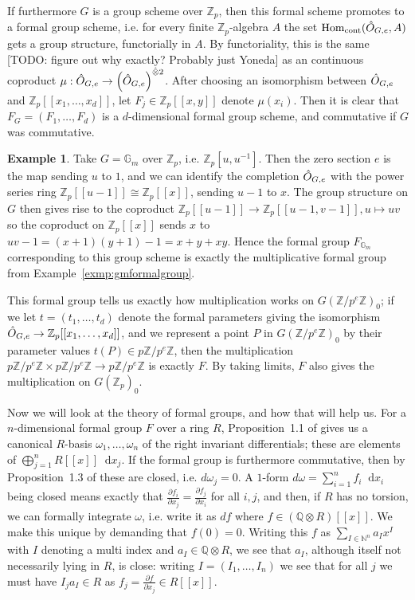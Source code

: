 \documentclass[12pt]{article}
\newcommand{\N}{\mathbb{N}}
\newcommand{\Z}{\mathbb{Z}}
\renewcommand{\G}{\mathbb{G}}
\newcommand{\Q}{\mathbb{Q}}
\newcommand*\diff{\mathop{}\!\mathrm{d}}
\newcommand{\tensor}{\otimes}
\DeclareMathOperator{\Hom}{Hom}
\theoremstyle{plain}
\theoremstyle{definition}
\newtheorem{exmp}[thm]{Example} %
\theoremstyle{remark}
\begin{document}
If furthermore $G$ is a group scheme over $\Z_p$, then this formal scheme promotes to a formal group scheme, i.e. for every finite $\Z_p$-algebra $A$ the set $\Hom_{\text{cont}}(\Hat{O}_{G,e},A)$ gets a group structure, functorially in $A$. By functoriality, this is the same [TODO: figure out why exactly? Probably just Yoneda] as an continuous coproduct $\mu: \Hat{O}_{G,e} \to \left(\Hat{O}_{G,e}\right)^{\Hat{\tensor} 2}$. After choosing an isomorphism between $\Hat{O}_{G,e}$ and $\Z_p[[x_1,\dots,x_d]]$, let $F_j \in \Z_p[[x,y]]$ denote $\mu(x_i)$. Then it is clear that $F_G = (F_1,\dots,F_d)$ is a $d$-dimensional formal group scheme, and commutative if $G$ was commutative.
\begin{exmp}
\label{exmp:gmtoformal} 
Take $G = \G_m$ over $\Z_p$, i.e. $\Z_p[u,u^{-1}]$. Then the zero section $e$ is the map sending $u$ to $1$, and we can identify the completion $\Hat{O}_{G,e}$ with the power series ring $\Z_p[[u-1]] \cong \Z_p[[x]]$, sending $u-1$ to $x$. The group structure on $G$ then gives rise to the coproduct $\Z_p[[u-1]] \to \Z_p[[u-1,v-1]], u \mapsto uv$ so the coproduct on $\Z_p[[x]]$ sends $x$ to $uv-1 = (x+1)(y+1) -1 = x + y + xy$. Hence the formal group $F_{\G_m}$ corresponding to this group scheme is exactly the multiplicative formal group from Example~\ref{exmp:gmformalgroup}.
\end{exmp}

This formal group tells us exactly how multiplication works on $G(\Z/p^e\Z)_0$; if we let $t = (t_1,\dots,t_d)$ denote the formal parameters giving the isomorphism $\Hat{O}_{G,e} \to \Z_p[[x_1,\dots,x_d]]$, and we represent a point $P$ in $G(\Z/p^e\Z)_0$ by their parameter values $t(P) \in p\Z/p^e\Z$, then the multiplication $p\Z/p^e\Z \times p\Z/p^e\Z \to p\Z/p^e\Z$ is exactly $F$. By taking limits, $F$ also gives the multiplication on $G(\Z_p)_0$.

Now we will look at the theory of formal groups, and how that will help us. For a $n$-dimensional formal group $F$ over a ring $R$, Proposition~1.1 of \citep{honda70} gives us a canonical $R$-basis $\omega_1,\dots,\omega_n$ of the right invariant differentials; these are elements of $\bigoplus_{j=1}^n R[[x]] \diff x_j$. If the formal group is furthermore commutative, then by Proposition~1.3 of \citep{honda70} these are closed, i.e. $d\omega_j = 0$. A $1$-form $d\omega = \sum_{i=1}^n f_i \diff x_i$ being closed means exactly that $\frac{\partial f_i}{\partial x_j} = \frac{\partial f_j}{\partial x_i}$ for all $i,j$, and then, if $R$ has no torsion, we can formally integrate $\omega$, i.e. write it as $df$ where $f \in (\Q\tensor R)[[x]]$. We make this unique by demanding that $f(0) = 0$. Writing this $f$ as $\sum_{I \in \N^n} a_I x^I$ with $I$ denoting a multi index and $a_I \in \Q\tensor R$, we see that $a_I$, although itself not necessarily lying in $R$, is close: writing $I = (I_1,\dots,I_n)$ we see that for all $j$ we must have $I_j a_I \in R$ as $f_j = \frac{\partial f}{\partial x_j} \in R[[x]]$.
\end{document}
